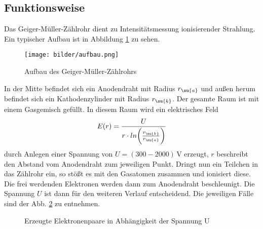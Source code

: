 \subsection{Funktionsweise}
Das Geiger-Müller-Zählrohr dient zu Intensitätsmessung ionisierender Strahlung.
Ein typischer Aufbau ist in Abbildung \ref{fig:aufbau} zu sehen.
\begin{figure}
  \centering
  \texttt{[image: bilder/aufbau.png]}
  \caption{Aufbau des Geiger-Müller-Zählrohrs \cite{703}
  \label{fig:aufbau}}
\end{figure}
In der Mitte befindet sich ein Anodendraht mit Radius $r_\su{a}$ und außen herum
befindet sich ein Kathodenzylinder mit Radius $r_\su{k}$. Der gesamte Raum ist mit
einem Gasgemisch gefüllt. In diesem Raum wird ein elektrisches Feld
\begin{equation}
  E(r)= \frac{U}{r \cdot ln \bigg( \frac{r_\su{k}}{r_\su{a}}\bigg)}
\end{equation}
durch Anlegen einer Spannung von $U = (300-2000) \,\si{\volt}$ erzeugt, $r$
beschreibt den Abstand vom Anodendraht zum jeweiligen Punkt.
Dringt nun ein Teilchen in das Zählrohr ein, so stößt es mit den Gasatomen zusammen
und ionisiert diese. Die frei werdenden Elektronen werden dann zum Anodendraht
beschleunigt. Die Spannung $U$ ist dann für den weiteren Verlauf entscheidend.
Die jeweiligen Fälle sind der Abb. \ref{fig:bereiche}
zu entnehmen.
\begin{figure}
  \centering
  \caption{Erzeugte Elektronenpaare in Abhängigkeit der Spannung U \cite{703}}
  \label{fig:bereiche}
\end{figure}
